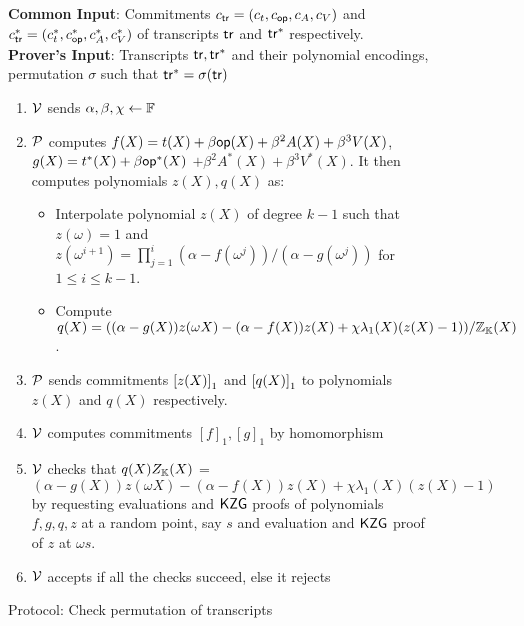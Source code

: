 \begin{figure}[htbp]

    \begin{mdframed}
    {
            {\bf Common Input}: Commitments $c_{\mathsf{tr}}=(c_t,c_{\mathsf{op}},c_A, c_V)$ and $c_{\mathsf{tr}}^\ast=(c_t^\ast,c_{\mathsf{op}}^\ast, c_A^\ast, c_V^\ast)$
        of transcripts $\mathsf{tr}$ and $\mathsf{tr}^\ast$ respectively.\\
    {\bf Prover's Input}: Transcripts $\mathsf{tr}, \mathsf{tr}^{*}$ and their polynomial encodings, permutation $\sigma$ such that $\mathsf{tr}^{*}=\sigma(\mathsf{tr})$
        \begin{enumerate}[leftmargin=1em, label=\arabic*]
            \item $\mathcal{V}$ sends $\alpha,\beta, \chi\gets \mathbb{F}$
            \item $\mathcal{P}$ computes $f(X)=t(X) + \beta \mathsf{op}(X) + \beta^2 A(X) + \beta^3 V(X)$, $g(X) = t^\ast(X) + \beta \mathsf{op}^\ast(X)$
            $+ \beta^2 A^\ast(X) + \beta^3 V^\ast(X)$. It then computes polynomials $z(X),q(X)$ as:
            \begin{itemize}[leftmargin=1em]
                \item Interpolate polynomial $z(X)$ of degree $k-1$ such that $z(\omega)=1$ and
                $z(\omega^{i+1})=\prod_{j=1}^i (\alpha - f(\omega^j))/(\alpha - g(\omega^j))$ for $1\leq i\leq k-1$.
                \item Compute $q(X) = ((\alpha - g(X))z(\omega X) - (\alpha - f(X))z(X) + \chi\lambda_1(X)(z(X) - 1))/\mathbb{Z}_{\mathbb{K}}(X)$.
            \end{itemize}
            \item $\mathcal{P}$ sends commitments $\left[{z(X)}\right]_1$ and $\left[{q(X)}\right]_1$ to polynomials $z(X)$ and $q(X)$ respectively.
            \item $\mathcal{V}$ computes commitments $[f]_1, [g]_1$ by homomorphism
            \item $\mathcal{V}$ checks that $q(X)Z_{\mathbb{K}}(X)$ = $(\alpha - g(X))z(\omega X)-(\alpha - f(X))z(X) + \chi\lambda_1(X)(z(X) - 1)$
            by requesting evaluations and $\mathsf{KZG}$ proofs of polynomials $f,g, q, z$ at a random point, say $s$ and evaluation and $\mathsf{KZG}$ proof of $z$ at $\omega s$.
            \item $\mathcal{V}$ accepts if all the checks succeed, else it rejects
        \end{enumerate}
    }
    \end{mdframed}
    \caption{Protocol: Check permutation of transcripts}
    \label{fig:permutated-transcripts}
\end{figure}


